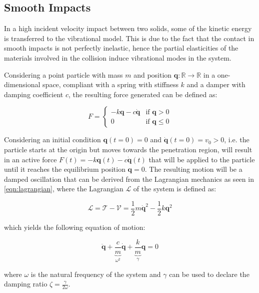 \subsection{Smooth Impacts}

In a high incident velocity impact between two solids, some of the kinetic energy is transferred to the vibrational model. This is due to the fact that the contact in smooth impacts is not perfectly inelastic, hence the partial elasticities of the materials involved in the collision induce vibrational modes in the system.

Considering a point particle with mass $m$ and position $\mathbf{q}: \mathbb{R} \rightarrow \mathbb{R}$ in a one-dimensional space, compliant with a spring with stiffness $k$ and a damper with damping coefficient $c$, the resulting force generated can be defined as:

\begin{equation}
    F = \begin{cases}
        -k\mathbf{q} - c\dot{\mathbf{q}} & \text{if } \mathbf{q} > 0    \\
        0                                & \text{if } \mathbf{q} \leq 0
    \end{cases}
\end{equation}

Considering an initial condition $\mathbf{q}(t=0) = 0$ and $\dot{\mathbf{q}}(t=0) = v_0 > 0$, i.e. the particle starts at the origin but moves towards the penetration region, will result in an active force $F(t) = -k\mathbf{q}(t) - c\dot{\mathbf{q}}(t)$ that will be applied to the particle until it reaches the equilibrium position $\mathbf{q} = 0$. The resulting motion will be a damped oscillation that can be derived from the Lagrangian mechanics as seen in \cref{eqn:lagrangian}, where the Lagrangian $\mathcal{L}$ of the system is defined as:

\begin{equation}
    \mathcal{L} = \mathcal{T} - \mathcal{V} = \frac{1}{2}m\dot{\mathbf{q}}^2 - \frac{1}{2}k\mathbf{q}^2
\end{equation}

which yields the following equation of motion:

\begin{equation}
    \ddot{\mathbf{q}} + \underbrace{\frac{c}{m}} _{\omega ^2} \dot{\mathbf{q}} + \underbrace{\frac{k}{m}} _\gamma \mathbf{q} = 0
\end{equation}

where $\omega$ is the natural frequency of the system and $\gamma$ can be used to declare the damping ratio $\zeta = \frac{\gamma}{2\omega}$.

